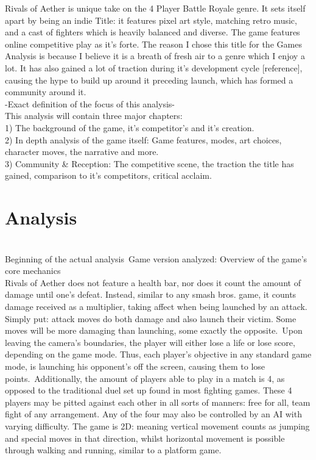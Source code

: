 \documentclass[11pt]{article}
\begin{document}
Rivals of Aether is unique take on the 4 Player Battle Royale genre. It sets itself apart by being an indie Title: it features pixel art style, matching retro music, and a cast of fighters which is heavily balanced and diverse. The game features online competitive play as it's forte. The reason I chose this title for the Games Analysis is because I believe it is a breath of fresh air to a genre which I enjoy a lot. It has also gained a lot of traction during it's development cycle [reference], causing the hype to build up around it preceding launch, which has formed a community around it.\\
-Exact definition of the focus of this analysis-\\
This analysis will contain three major chapters:\\
1) The background of the game, it's competitor's and it's creation.\\
2) In depth analysis of the game itself: Game features, modes, art choices, character moves, the narrative and more.\\
3) Community & Reception: The competitive scene, the traction the title has gained, comparison to it's competitors, critical acclaim.\\

\newpage
\chapter{Analysis}\\
Beginning of the actual analysis\
Game version analyzed: %
Overview of the game's core mechanics\\
Rivals of Aether does not feature a health bar, nor does it count the amount of damage until one's defeat. Instead, similar to any smash bros. game, it counts damage received as a multiplier, taking affect when being launched by an attack. Simply put: attack moves do both damage and also launch their victim. Some moves will be more damaging than launching, some exactly the opposite.\
Upon leaving the camera's boundaries, the player will either lose a life or lose score, depending on the game mode. Thus, each player's objective in any standard game mode, is launching his opponent's off the screen, causing them to lose points.\
 Additionally, the amount of players able to play in a match is 4, as opposed to the traditional duel set up found in most fighting games. These 4 players may be pitted against each other in all sorts of manners: free for all, team fight of any arrangement. Any of the four may also be controlled by an AI with varying difficulty. The game is 2D: meaning vertical movement counts as jumping and special moves in that direction, whilst horizontal movement is possible through walking and running, similar to a platform game.\\ %
\end{document}
